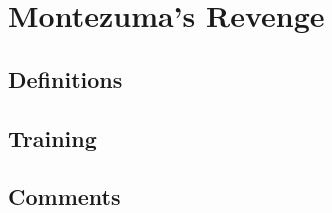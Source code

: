 \let\sectionbreak\savedsectionbreak

\section{Montezuma's Revenge}
\subsection{Definitions}
\subsection{Training}
\subsection{Comments}

